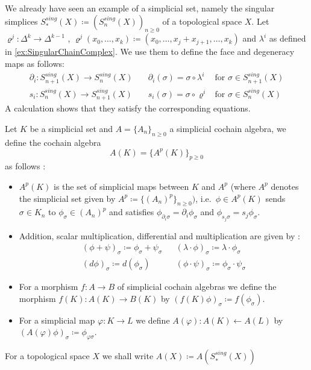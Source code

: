  \begin{Example}
 \label{ex:SingularSimplicesAreSimplicialSets}
    We already have seen an example of a simplicial set, namely the singular simplices 
    $S^{sing}_*(X) \coloneqq (S_n^{sing}(X))_{n \geq 0}$ of a topological space $X$.
    Let
    $\varrho^j \colon \Delta^k \to \Delta^{k - 1}$ ,
    ${\varrho^j(x_0, \dotsc , x_k) \coloneqq (x_0 , \dotsc, x_j + x_{j + 1} , \dotsc, x_k)}$ and 
    $\lambda^i$ as defined in \ref{ex:SingularChainComplex}. We use them to define the face
    and degeneracy maps as follows:
    \begin{align*}
     \partial_i \colon S_{n+1}^{sing}(X) \to S_n^{sing}(X) \quad	 &	 \partial_i(\sigma) =
      \sigma \circ \lambda^i  & \text{for $\sigma \in S_{n+1}^{sing}(X)$} 	\\
     s_i \colon S_n^{sing}(X) \to S_{n+1}^{sing}(X) \quad	&	s_i( \sigma) =
     \sigma \circ \varrho^i  & \text{for $\sigma \in S_{n}^{sing}(X)$}
    \end{align*}
    A calculation shows that they satisfy the corresponding equations.
 \end{Example}

 \begin{Definition}
  Let $K$ be a simplicial set and $A = { \lbrace A_n \rbrace}_{n \geq 0}$ a simplicial cochain algebra, we define the cochain algebra
  $$ A(K) = { \lbrace A^p(K) \rbrace}_{ p \geq 0} $$
  as follows :
  \begin{itemize}
   \item $A^p(K)$ is the set of simplicial maps between $K$ and $A^p$ 
   (where $A^p$ denotes the simplicial set given by $A^p \coloneqq {\lbrace (A_n)^p \rbrace}_{n \geq 0})$, i.e.\ 
   $\phi \in A^p(K)$ sends $\sigma \in K_n$ to $\phi_{\sigma} \in {(A_n)}^p$ and satisfies 
   $\phi_{ \partial_i \sigma} = \partial_i \phi_{\sigma}$ and $\phi_{ s_j \sigma} = s_j \phi_{\sigma}$.
   
   \item Addition, scalar multiplication, differential and multiplication are given by :
   \begin{align*}
    (\phi + \psi)_{\sigma} \coloneqq \phi_{\sigma} + \psi_{\sigma} & &  
    (\lambda \cdot \phi)_{\sigma} \coloneqq \lambda \cdot \phi_{\sigma} \\
    (d \phi)_{\sigma} \coloneqq d( \phi_{\sigma}) & & 
    {(\phi \cdot \psi)}_{\sigma} \coloneqq \phi_{\sigma}  \cdot \psi_{\sigma}
   \end{align*}
  
    \item For a morphism $f \colon A \to B$ \; of simplicial cochain algebras we define the morphism
      ${f(K) \colon A(K) \to B(K)}$ by $(f(K) \phi)_{\sigma} \coloneqq f(\phi_{\sigma})$.
    
    \item For a simplicial map $\varphi \colon K \to L$ we define ${A(\varphi) \colon A(K) \gets A(L)}$
      by $(A(\varphi) \phi)_{\sigma} \coloneqq \phi_{\varphi \sigma}$.
  \end{itemize}
  For a topological space $X$ we shall write $A(X) \coloneqq A(S_*^{sing}(X))$
 \end{Definition}

